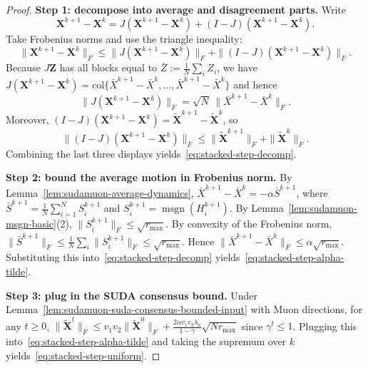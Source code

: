 \documentclass{article}
\begin{document}
\begin{proof}
\medskip\noindent\textbf{Step 1: decompose into average and disagreement parts.}
Write
\[
\mathbf{X}^{k+1}-\mathbf{X}^k
=J(\mathbf{X}^{k+1}-\mathbf{X}^k) + (I-J)(\mathbf{X}^{k+1}-\mathbf{X}^k).
\]
Take Frobenius norms and use the triangle inequality:
\[
\|\mathbf{X}^{k+1}-\mathbf{X}^k\|_F
\le \|J(\mathbf{X}^{k+1}-\mathbf{X}^k)\|_F + \|(I-J)(\mathbf{X}^{k+1}-\mathbf{X}^k)\|_F.
\]
Because $J\mathbf{Z}$ has all blocks equal to $\bar Z:=\tfrac1N\sum_i Z_i$, we have
$J(\mathbf{X}^{k+1}-\mathbf{X}^k)=\mathrm{col}\{\bar X^{k+1}-\bar X^k,\ldots,\bar X^{k+1}-\bar X^k\}$ and hence
\[
\|J(\mathbf{X}^{k+1}-\mathbf{X}^k)\|_F = \sqrt{N}\,\|\bar X^{k+1}-\bar X^k\|_F.
\]
Moreover, $(I-J)(\mathbf{X}^{k+1}-\mathbf{X}^k)=\tilde{\mathbf{X}}^{k+1}-\tilde{\mathbf{X}}^k$, so
\[
\|(I-J)(\mathbf{X}^{k+1}-\mathbf{X}^k)\|_F
\le \|\tilde{\mathbf{X}}^{k+1}\|_F+\|\tilde{\mathbf{X}}^{k}\|_F.
\]
Combining the last three displays yields~\eqref{eq:stacked-step-decomp}.

\medskip\noindent\textbf{Step 2: bound the average motion in Frobenius norm.}
By Lemma~\ref{lem:sudamuon-average-dynamics},
$\bar X^{k+1}-\bar X^k=-\alpha\bar S^{k+1}$, where $\bar S^{k+1}=\tfrac1N\sum_{i=1}^N S_i^{k+1}$ and $S_i^{k+1}=\operatorname{msgn}(H_i^{k+1})$.
By Lemma~\ref{lem:sudamuon-msgn-basic}(2), $\|S_i^{k+1}\|_F\le \sqrt{r_{\max}}$.
By convexity of the Frobenius norm,
$\|\bar S^{k+1}\|_F\le \tfrac1N\sum_i \|S_i^{k+1}\|_F\le \sqrt{r_{\max}}$.
Hence $\|\bar X^{k+1}-\bar X^k\|_F\le \alpha\sqrt{r_{\max}}$.
Substituting this into~\eqref{eq:stacked-step-decomp} yields~\eqref{eq:stacked-step-alpha-tilde}.

\medskip\noindent\textbf{Step 3: plug in the SUDA consensus bound.}
Under Lemma~\ref{lem:sudamuon-suda-consensus-bounded-input} with Muon directions, for any $t\ge 0$,
$\|\tilde{\mathbf{X}}^t\|_F\le v_1v_2\|\tilde{\mathbf{X}}^0\|_F+\tfrac{2\alpha v_1v_2\lambda_a}{1-\gamma}\sqrt{Nr_{\max}}$ since $\gamma^t\le 1$.
Plugging this into~\eqref{eq:stacked-step-alpha-tilde} and taking the supremum over $k$ yields~\eqref{eq:stacked-step-uniform}.
\end{proof}
\end{document}
